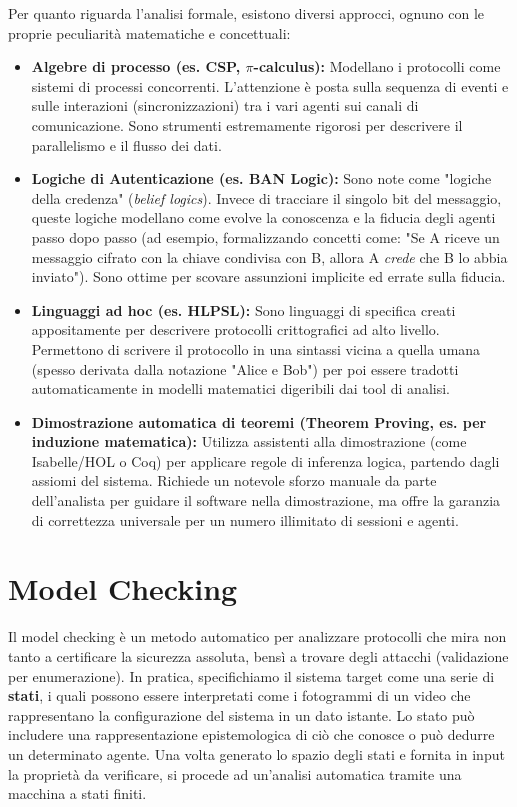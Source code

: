 Per quanto riguarda l'analisi formale, esistono diversi approcci, ognuno con le proprie peculiarità matematiche e concettuali:
\begin{itemize}
    \item \textbf{Algebre di processo (es. CSP, $\pi$-calculus):} Modellano i protocolli come sistemi di processi concorrenti. L'attenzione è posta sulla sequenza di eventi e sulle interazioni (sincronizzazioni) tra i vari agenti sui canali di comunicazione. Sono strumenti estremamente rigorosi per descrivere il parallelismo e il flusso dei dati.
    \item \textbf{Logiche di Autenticazione (es. BAN Logic):} Sono note come "logiche della credenza" (\textit{belief logics}). Invece di tracciare il singolo bit del messaggio, queste logiche modellano come evolve la conoscenza e la fiducia degli agenti passo dopo passo (ad esempio, formalizzando concetti come: "Se A riceve un messaggio cifrato con la chiave condivisa con B, allora A \textit{crede} che B lo abbia inviato"). Sono ottime per scovare assunzioni implicite ed errate sulla fiducia.
    \item \textbf{Linguaggi ad hoc (es. HLPSL):} Sono linguaggi di specifica creati appositamente per descrivere protocolli crittografici ad alto livello. Permettono di scrivere il protocollo in una sintassi vicina a quella umana (spesso derivata dalla notazione "Alice e Bob") per poi essere tradotti automaticamente in modelli matematici digeribili dai tool di analisi.
    \item \textbf{Dimostrazione automatica di teoremi (Theorem Proving, es. per induzione matematica):} Utilizza assistenti alla dimostrazione (come Isabelle/HOL o Coq) per applicare regole di inferenza logica, partendo dagli assiomi del sistema. Richiede un notevole sforzo manuale da parte dell'analista per guidare il software nella dimostrazione, ma offre la garanzia di correttezza universale per un numero illimitato di sessioni e agenti.
\end{itemize}
\section{Model Checking}
Il model checking è un metodo automatico per analizzare protocolli che mira non tanto a certificare la sicurezza assoluta, bensì a trovare degli attacchi (validazione per enumerazione). In pratica, specifichiamo il sistema target come una serie di \textbf{stati}, i quali possono essere interpretati come i fotogrammi di un video che rappresentano la configurazione del sistema in un dato istante. Lo stato può includere una rappresentazione epistemologica di ciò che conosce o può dedurre un determinato agente. Una volta generato lo spazio degli stati e fornita in input la proprietà da verificare, si procede ad un'analisi automatica tramite una macchina a stati finiti.

